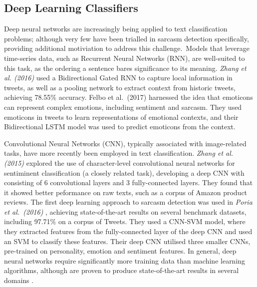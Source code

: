 \documentclass[12pt,a4paper]{article}
\begin{document}
\subsection{Deep Learning Classifiers}\vspace{-10pt}
\noindent Deep neural networks are increasingly being applied to text classification problems; although very few have been trialled in sarcasm detection specifically, providing additional motiviation to address this challenge.\ Models that leverage time-series data, such as Recurrent Neural Networks (RNN), are well-suited to this task, as the ordering a sentence bares significance to its meaning. \textit{Zhang et al. (2016)} \cite{zhang2016tweet} used a Bidirectional Gated RNN to capture local information in tweets, as well as a pooling network to extract context from historic tweets, achieving 78.55\% accuracy. Felbo et al.\ (2017)\cite{felbo2017using} harnessed the idea that emoticons can represent complex emotions, including sentiment and sarcasm. They used emoticons in tweets to learn representations of emotional contexts, and their Bidirectional LSTM model was used to predict emoticons from the context.

Convolutional Neural Networks (CNN), typically associated with image-related tasks, have more recently been employed in text classification. \textit{Zhang et al. (2015)} \cite{zhang2015character} explored the use of character-level convolutional neural networks for sentiminent classification (a closely related task), developing a deep CNN with consisting of 6 convolutional layers and 3 fully-connected layers. They found that it showed better peformance on raw texts, such as a corpus of Amazon product reviews. The first deep learning approach to sarcasm detection was used in \textit{Poria et al.\ (2016)} \cite{poria2016deeper}, achieving state-of-the-art results on several benchmark datasets, including 97.71\% on a corpus of Tweets. They used a CNN-SVM model, where they extracted features from the fully-connected layer of the deep CNN and used an SVM to classify these features. Their deep CNN utilised three smaller CNNs, pre-trained on personality, emotion and sentiment features. In general, deep neural networks require significantly more training data than machine learning algorithms, although are proven to produce state-of-the-art results in several domains \cite{lecun2015deep}.


\end{document}
